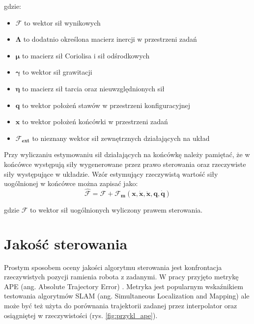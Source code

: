 gdzie:
\begin{itemize}
	\item $\boldsymbol{\mathcal{F}}$ to wektor sił wynikowych
	\item $\boldsymbol{\Lambda}$ to dodatnio określona macierz inercji w przestrzeni zadań
	\item $\boldsymbol{\mu}$ to macierz sił Coriolisa i sił odśrodkowych	
	\item $\boldsymbol{\gamma}$ to wektor sił grawitacji
	\item $\boldsymbol{\eta}$ to macierz sił tarcia oraz nieuwzględnionych sił
	\item $\boldsymbol{q}$ to wektor położeń stawów w przestrzeni konfiguracyjnej
	\item $\boldsymbol{x}$ to wektor położeń końcówki w przestrzeni zadań
	\item $ \boldsymbol{\mathcal{F}_{ext}}$ to nieznany wektor sił zewnętrznych działających na układ
\end{itemize} 

Przy wyliczaniu estymowaniu sił działających na końcówkę należy pamiętać, że w końcówce występują siły wygenerowane przez prawo sterowania oraz rzeczywiste siły występujące w układzie. Wzór estymujący rzeczywistą wartość siły uogólnionej w końcówce można zapisać jako:
\begin{equation}
\boldsymbol{\mathcal{\hat{F}}} = \boldsymbol{\mathcal{F}} + \boldsymbol{\mathcal{F}_m}(\boldsymbol{x}, \dot{\boldsymbol{x}}, \ddot{\boldsymbol{x}}, \boldsymbol{q}, \dot{\boldsymbol{q}})
\end{equation}

gdzie $\boldsymbol{\mathcal{F}}$ to wektor sił uogólnionych wyliczony prawem sterowania.

\section{Jakość sterowania}
\label{chap:ape}
Prostym sposobem oceny jakości algorytmu sterowania jest konfrontacja rzeczywistych pozycji ramienia robota z zadanymi. W pracy przyjęto metrykę APE (ang. Absolute Trajectory Error) \cite{bib:ape}. Metryka jest popularnym wskaźnikiem testowania algorytmów SLAM (ang. Simultaneous Localization and Mapping) ale może być też użyta do porównania trajektorii zadanej przez interpolator  oraz osiągniętej w rzeczywistości (rys. \ref{fig:przykl_ape}). 

